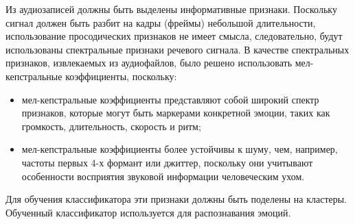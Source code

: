 Из аудиозаписей должны быть выделены информативные признаки. Поскольку сигнал должен быть разбит на кадры (фреймы) небольшой длительности, использование просодических признаков не имеет смысла, следовательно, будут использованы спектральные признаки речевого сигнала. В качестве спектральных признаков, извлекаемых из аудиофайлов, было решено использовать мел-кепстральные коэффициенты, поскольку:
\begin{itemize}
	\item мел-кепстральные коэффициенты представляют собой широкий спектр признаков, которые могут быть маркерами конкретной эмоции, таких как громкость, длительность, скорость и ритм;
	\item мел-кепстральные коэффициенты более устойчивы к шуму, чем, например, частоты первых 4-х формант или джиттер, поскольку они учитывают особенности восприятия звуковой информации человеческим ухом.
\end{itemize}

Для обучения классификатора эти признаки должны быть поделены на кластеры. Обученный классификатор используется для распознавания эмоций.
